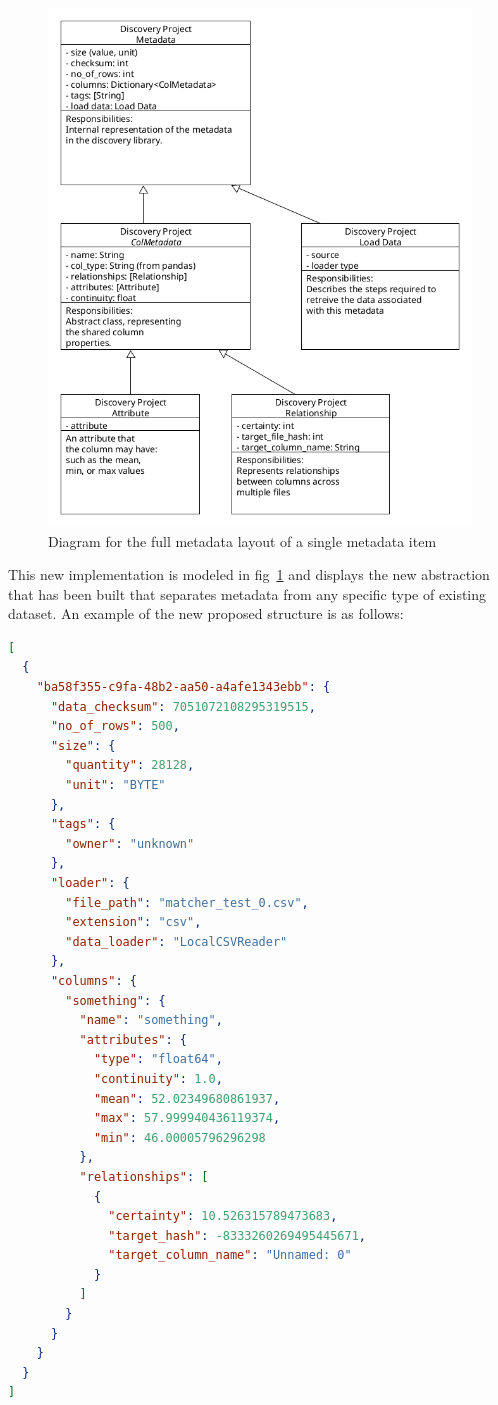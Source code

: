 \begin{figure}[H]
    \centering
    \includegraphics[width=12cm]{figures/metadata/metadata_v2}
    \caption{Diagram for the full metadata layout of a single metadata item}
    \label{fig:metadata_fig_3}
\end{figure}

This new implementation is modeled in fig~\ref{fig:metadata_fig_3} and displays the new abstraction that has been built
that separates metadata from any specific type of existing dataset.
An example of the new proposed structure is as follows:

\begin{lstlisting}[language=json,firstnumber=1,label={lst:lstlisting}]
[
  {
    "ba58f355-c9fa-48b2-aa50-a4afe1343ebb": {
      "data_checksum": 7051072108295319515,
      "no_of_rows": 500,
      "size": {
        "quantity": 28128,
        "unit": "BYTE"
      },
      "tags": {
        "owner": "unknown"
      },
      "loader": {
        "file_path": "matcher_test_0.csv",
        "extension": "csv",
        "data_loader": "LocalCSVReader"
      },
      "columns": {
        "something": {
          "name": "something",
          "attributes": {
            "type": "float64",
            "continuity": 1.0,
            "mean": 52.02349680861937,
            "max": 57.999940436119374,
            "min": 46.00005796296298
          },
          "relationships": [
            {
              "certainty": 10.526315789473683,
              "target_hash": -8333260269495445671,
              "target_column_name": "Unnamed: 0"
            }
          ]
        }
      }
    }
  }
]

\end{lstlisting}

